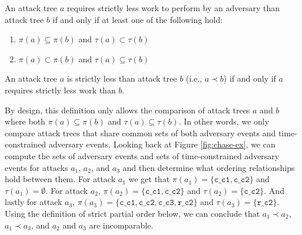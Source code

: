 \documentclass[runningheads]{llncs}
\theoremstyle{definition}
\newcommand{\squash}{\itemsep=0pt\parskip=0pt}
\begin{document}
\begin{definition}
  An attack tree $a$ requires strictly less work to perform by an adversary than attack tree $b$ if and only if at least one of the following hold: 
\begin{enumerate}
  \squash
  \item $\pi(a) \subseteq \pi(b)$ and $\tau(a) \subset \tau(b)$
  \item $\pi(a) \subset \pi(b)$ and $\tau(a) \subseteq \tau(b)$
\end{enumerate}
\end{definition}

\begin{definition}
  An attack tree $a$ is strictly less than attack tree $b$ (i.e., $a \prec b$) if and only if $a$ requires strictly less work than $b$.
\end{definition}

\noindent By design, this definition only allows the comparison of attack trees $a$ and $b$ where both $\pi(a) \subseteq \pi(b)$ and $\tau(a) \subseteq \tau(b)$. In other words, we only compare attack trees that share common sets of both adversary events and time-constrained adversary events. Looking back at Figure \ref{fig:chase-ex}, we can compute the sets of adversary events and sets of time-constrained adversary events for attacks $a_1$, $a_2$, and $a_3$ and then determine what ordering relationships hold between them. For attack $a_1$ we get that $\pi(a_1) = \{ \texttt{c\_c1}, \texttt{c\_c2} \}$ and $\tau(a_1) = \emptyset$. For attack $a_2$, $\pi(a_2) = \{ \texttt{c\_c1}, \texttt{c\_c2} \}$ and $\tau(a_2) = \{ \texttt{c\_c2} \}$. And lastly for attack $a_3$, $\pi(a_3) = \{ \texttt{c\_c1}, \texttt{c\_c2}, \texttt{c\_c3}, \texttt{r\_c2} \}$ and $\tau(a_3) = \{ \texttt{r\_c2} \}$. Using the definition of strict partial order below, we can conclude that $a_1 \prec a_2$, $a_1 \prec a_3$, and $a_2$ and $a_3$ are incomparable.
\end{document}
